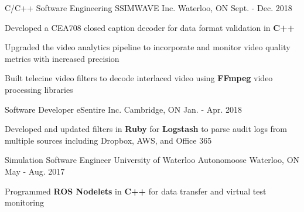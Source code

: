 \begin{cventries}

\cventry
{C/C++ Software Engineering} %
{SSIMWAVE Inc.} %
{Waterloo, ON} %
{Sept. - Dec. 2018} %
{ %
\begin{cvitems}
\item {Developed a CEA708 closed caption decoder for data format validation in {\bf C++}}
\item {Upgraded the video analytics pipeline to incorporate and monitor video quality metrics with increased precision}
\item {Built telecine video filters to decode interlaced video using {\bf FFmpeg} video processing libraries}
\end{cvitems}
}


\cventry
{Software Developer} %
{eSentire Inc.} %
{Cambridge, ON} %
{Jan. - Apr. 2018} %
{%
\begin{cvitems}
\item {Developed and updated filters in {\bf Ruby} for {\bf Logstash} to parse audit logs from multiple sources including Dropbox, AWS, and Office 365}
\end{cvitems}
}


\cventry
{Simulation Software Engineer} %
{University of Waterloo Autonomoose} %
{Waterloo, ON} %
{May - Aug. 2017} %
{%
\begin{cvitems}
\item {Programmed {\bf ROS Nodelets} in {\bf C++} for data transfer and virtual test monitoring}
\end{cvitems}
}


\end{cventries}
